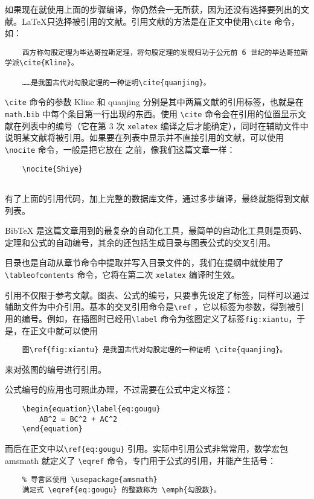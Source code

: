 如果现在就使用上面的步骤编译，你仍然会一无所获，因为还没有选择要列出的文献。\LaTeX 只选择被引用的文献。引用文献的方法是在正文中使用\verb|\cite| 命令，如：

\begin{lstlisting}
    西方称勾股定理为毕达哥拉斯定理，将勾股定理的发现归功于公元前 6 世纪的毕达哥拉斯学派\cite{Kline}。

    ……是我国古代对勾股定理的一种证明\cite{quanjing}。
\end{lstlisting}
\verb|\cite| 命令的参数 Kline 和 quanjing 分别是其中两篇文献的引用标签，也就是在 \verb|math.bib| 中每个条目第一行出现的东西。使用 \verb|\cite| 命令会在引用的位置显示文献在列表中的编号（它在第 3 次 \verb|xelatex| 编译之后才能确定），同时在辅助文件中说明某文献将被引用。如果要在列表中显示并不直接引用的文献，可以使用 \verb|\nocite| 命令，一般是把它放在\verb|| 之前，像我们这篇文章一样：

\begin{lstlisting}
    \nocite{Shiye}
    
\end{lstlisting}

有了上面的引用代码，加上完整的数据库文件，通过多步编译，最终就能得到文献列表。

BibTeX 是这篇文章用到的最复杂的自动化工具，最简单的自动化工具则是页码、定理和公式的自动编号，其余的还包括生成目录与图表公式的交叉引用。

目录也是自动从章节命令中提取并写入目录文件的，我们在提纲中就使用了\verb|\tableofcontents| 命令，它将在第二次 \verb|xelatex| 编译时生效。

引用不仅限于参考文献。图表、公式的编号，只要事先设定了标签，同样可以通过辅助文件为中介引用。基本的交叉引用命令是\verb|\ref| ，它以标签为参数，得到被引用的编号。例如，在插图时已经用\verb|\label| 命令为弦图定义了标签\verb|fig:xiantu|，于是，在正文中就可以使用
\begin{lstlisting}
    图\ref{fig:xiantu} 是我国古代对勾股定理的一种证明 \cite{quanjing}。
\end{lstlisting}
来对弦图的编号进行引用。

公式编号的应用也可照此办理，不过需要在公式中定义标签：
\begin{lstlisting}
    \begin{equation}\label{eq:gougu}
        AB^2 = BC^2 + AC^2 
    \end{equation}
\end{lstlisting}
而后在正文中以\verb|\ref{eq:gougu}| 引用。实际中引用公式非常常用，数学宏包 amsmath 就定义了 \verb|\eqref| 命令，专门用于公式的引用，并能产生括号：
\begin{lstlisting}
    % 导言区使用 \usepackage{amsmath}
    满足式 \eqref{eq:gougu} 的整数称为 \emph{勾股数}。
\end{lstlisting}

